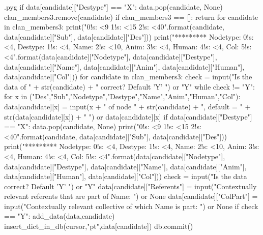 \documentclass{report}
\makeatletter
\newenvironment{python}{%
  \VerbatimEnvironment
  \minted@resetoptions
  \setkeys{minted@opt}{}
      \begin{VerbatimOut}{\jobname.pyg}}
{%
      \end{VerbatimOut}
      \minted@pygmentize{python}
      \DeleteFile{\jobname.pyg}}
\makeatother
\begin{document}
\begin{python}
                if data[candidate]["Destype"] == "X":
                    data.pop(candidate, None)
                    clan_members3.remove(candidate)
                    if clan_members3 == []:
                        return
    for candidate in clan_members3:
        print("{0!s: <9} {1!s: <15} {2!s: <40}".format(candidate, data[candidate]["Sub"], data[candidate]["Des"]))
        print("********* Nodetype: {0!s: <4}, Destype: {1!s: <4}, Name: {2!s: <10}, Anim: {3!s: <4}, Human: {4!s: <4}, Col: {5!s: <4}".format(data[candidate]["Nodetype"], data[candidate]["Destype"], data[candidate]["Name"], data[candidate]["Anim"], data[candidate]["Human"], data[candidate]["Col"]))
    for candidate in clan_members3:
        check = input("Is the data of " + str(candidate) + " correct? Default 'Y' ") or "Y"
        while check != "Y":
            for x in ("Des","Sub","Nodetype","Destype","Name","Anim","Human","Col"):
                data[candidate][x] = input(x + " of node " + str(candidate) + ", default = " + str(data[candidate][x]) + " ") or data[candidate][x] 
                if data[candidate]["Destype"] == "X":
                    data.pop(candidate, None)
            print("{0!s: <9} {1!s: <15} {2!s: <40}".format(candidate, data[candidate]["Sub"], data[candidate]["Des"]))
            print("********* Nodetype: {0!s: <4}, Destype: {1!s: <4}, Name: {2!s: <10}, Anim: {3!s: <4}, Human: {4!s: <4}, Col: {5!s: <4}".format(data[candidate]["Nodetype"], data[candidate]["Destype"], data[candidate]["Name"], data[candidate]["Anim"], data[candidate]["Human"], data[candidate]["Col"]))
            check = input("Is the data correct? Default 'Y' ") or "Y"
        data[candidate]["Referents"] = input("Contextually relevant referents that are part of Name: ") or None
        data[candidate]["ColPart"] = input("Contextually relevant collective of which Name is part: ") or None
        if check == "Y":
            add_data(data,candidate)
            insert_dict_in_db(cursor,"pt",data[candidate])
            db.commit()

\end{python}
\end{document}
